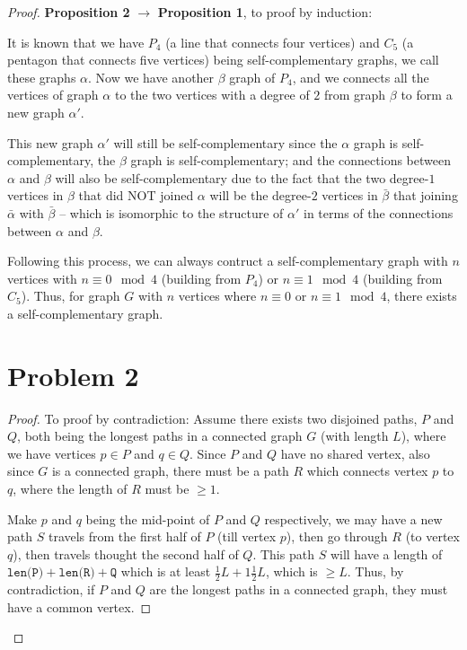 \documentclass[12pt]{article}
\newcommand{\ilc}{\texttt}
\begin{document}
\begin{proof}
\textbf{Proposition 2} $\longrightarrow$ \textbf{Proposition 1}, to proof by induction:\newline

It is known that we have $P_4$ (a line that connects four vertices) and $C_5$ (a pentagon that connects five vertices) being self-complementary graphs, we call these graphs $\alpha$. Now we have another $\beta$ graph of $P_4$, and we connects all the vertices of graph $\alpha$ to the two vertices with a degree of $2$ from graph $\beta$ to form a new graph $\alpha'$.

This new graph $\alpha'$ will still be self-complementary since the $\alpha$ graph is self-complementary, the $\beta$ graph is self-complementary; and the connections between $\alpha$ and $\beta$ will also be self-complementary due to the fact that the two degree-$1$ vertices in $\beta$ that did NOT joined $\alpha$ will be the degree-$2$ vertices in $\bar{\beta}$ that joining $\bar{\alpha}$ with $\bar{\beta}$ -- which is isomorphic to the structure of $\alpha'$ in terms of the connections between $\alpha$ and $\beta$.\newline

Following this process, we can always contruct a self-complementary graph with $n$ vertices with $n \equiv 0 \mod 4$ (building from $P_4$)  or $n \equiv 1 \mod 4$ (building from $C_5$). Thus, for graph $G$ with $n$ vertices where $n \equiv 0$ or $n \equiv 1 \mod 4$, there exists a self-complementary graph.
\section{Problem 2}

\begin{proof}
To proof by contradiction:\newline
Assume there exists two disjoined paths, $P$ and $Q$, both being the longest paths in a connected graph $G$ (with length $L$), where we have vertices $p \in P$ and $q \in Q$. Since $P$ and $Q$ have no shared vertex, also since $G$ is a connected graph, there must be a path $R$ which connects vertex $p$ to $q$, where the length of $R$ must be $\geq 1$.

Make $p$ and $q$ being the mid-point of $P$ and $Q$ respectively, we may have a new path $S$ travels from the first half of $P$ (till vertex $p$), then go through $R$ (to vertex $q$), then travels thought the second half of $Q$. This path $S$ will have a length of $\ilc{len(P)} + \ilc{len(R)} + \ilc{Q}$ which is at least $\frac{1}{2}L + 1 \frac{1}{2}L$, which is $\geq L$. Thus, by contradiction, if $P$ and $Q$ are the longest paths in a connected graph, they must have a common vertex.


\end{proof}
\end{proof}
\end{document}
